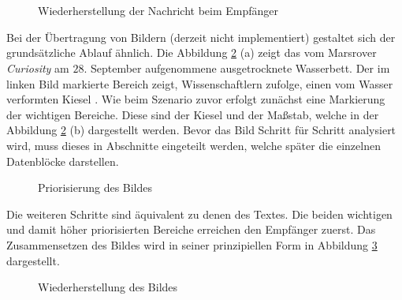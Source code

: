 \begin{figure}[H]
	\centering
	\\
	\\
	\label{fig:chatguiexample}
	\caption{Wiederherstellung der Nachricht beim Empfänger}
\end{figure}

Bei der Übertragung von Bildern (derzeit nicht implementiert) gestaltet sich der
grundsätzliche Ablauf ähnlich. Die Abbildung \ref{fig:marsWaterResidue} (a)
zeigt das vom Marsrover \textit{Curiosity} am $28.$ September aufgenommene
ausgetrocknete Wasserbett. Der im linken Bild markierte Bereich zeigt,
Wissenschaftlern zufolge, einen vom Wasser verformten Kiesel \cite{web11}. Wie
beim Szenario zuvor erfolgt zunächst eine Markierung der wichtigen Bereiche.
Diese sind der Kiesel und der Maßstab, welche in der Abbildung
\ref{fig:marsWaterResidue} (b) dargestellt werden. Bevor das Bild Schritt für
Schritt analysiert wird, muss dieses in Abschnitte eingeteilt werden, welche
später die einzelnen Datenblöcke darstellen.
 
\begin{figure}[H]
	\centering
	\hfill
	\hfill
	\label{fig:marsWaterResidue}
	\caption[Priorisierung des Bildes]{Priorisierung des Bildes \cite{img3}}
\end{figure}

Die weiteren Schritte sind äquivalent zu denen des Textes. Die beiden wichtigen
und damit höher priorisierten Bereiche erreichen den Empfänger zuerst.
Das Zusammensetzen des Bildes wird in seiner prinzipiellen Form in
Abbildung \ref{fig:marsWaterResidueEmpfaenger} dargestellt.

\begin{figure}[H]
	\centering
	\hfill
	\hfill
	\label{fig:marsWaterResidueEmpfaenger}
	\caption{Wiederherstellung des Bildes}
\end{figure}